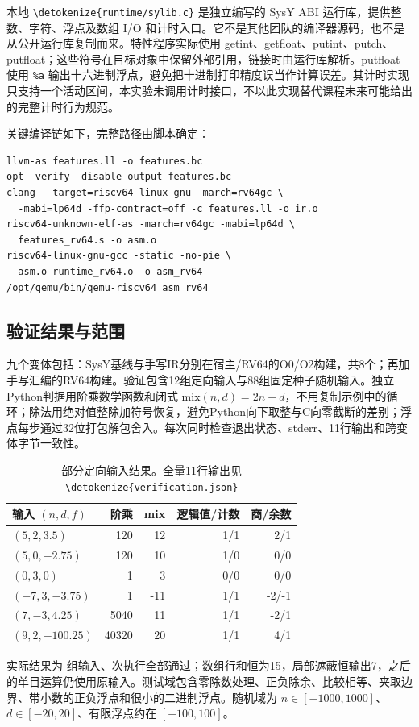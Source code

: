 \documentclass[UTF8,a4paper,10pt,fontset=none]{ctexart}
\newcommand{\code}[1]{{\small\expandafter\nolinkurl\expandafter{\detokenize{#1}}}}
\begin{document}
本地 \code{runtime/sylib.c} 是独立编写的 SysY ABI 运行库，提供整数、字符、浮点及数组 I/O 和计时入口。它不是其他团队的编译器源码，也不是从公开运行库复制而来。特性程序实际使用 getint、getfloat、putint、putch、putfloat；这些符号在目标对象中保留外部引用，链接时由运行库解析。putfloat 使用 \texttt{\%a} 输出十六进制浮点，避免把十进制打印精度误当作计算误差。其计时实现只支持一个活动区间，本实验未调用计时接口，不以此实现替代课程未来可能给出的完整计时行为规范。

关键编译链如下，完整路径由脚本确定：
\begin{lstlisting}[numbers=none]
llvm-as features.ll -o features.bc
opt -verify -disable-output features.bc
clang --target=riscv64-linux-gnu -march=rv64gc \
  -mabi=lp64d -ffp-contract=off -c features.ll -o ir.o
riscv64-unknown-elf-as -march=rv64gc -mabi=lp64d \
  features_rv64.s -o asm.o
riscv64-linux-gnu-gcc -static -no-pie \
  asm.o runtime_rv64.o -o asm_rv64
/opt/qemu/bin/qemu-riscv64 asm_rv64
\end{lstlisting}

\subsection{验证结果与范围}
九个变体包括：SysY基线与手写IR分别在宿主/RV64的O0/O2构建，共8个；再加手写汇编的RV64构建。验证包含12组定向输入与88组固定种子随机输入。独立Python判据用阶乘数学函数和闭式 $\mathrm{mix}(n,d)=2n+d$，不用复制示例中的循环；除法用绝对值整除加符号恢复，避免Python向下取整与C向零截断的差别；浮点每步通过32位打包解包舍入。每次同时检查退出状态、stderr、11行输出和跨变体字节一致性。

\begin{table}[H]
\centering
\begin{tabular}{lrrrr}
\toprule 输入 $(n,d,f)$ & 阶乘 & mix & 逻辑值/计数 & 商/余数 \\
\midrule
$(5,2,3.5)$ &120&12&1/1&2/1\\
$(5,0,-2.75)$ &120&10&1/0&0/0\\
$(0,3,0)$ &1&3&0/0&0/0\\
$(-7,3,-3.75)$ &1&-11&1/1&-2/-1\\
$(7,-3,4.25)$ &5040&11&1/1&-2/1\\
$(9,2,-100.25)$ &40320&20&1/1&4/1\\
\bottomrule
\end{tabular}
\caption{部分定向输入结果。全量11行输出见 \code{verification.json}}
\end{table}

实际结果为 \TestCases 组输入、\TestRuns 次执行全部通过；数组行和恒为15，局部遮蔽恒输出7，之后的单目运算仍使用原输入。测试域包含零除数处理、正负除余、比较相等、夹取边界、带小数的正负浮点和很小的二进制浮点。随机域为 $n\in[-1000,1000]$、$d\in[-20,20]$、有限浮点约在 $[-100,100]$。
\end{document}
